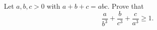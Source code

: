 Let $a,b,c>0$ with $a+b+c=abc$. Prove that
\[
\dfrac{a}{b^3}+\dfrac{b}{c^3}+\dfrac{c}{a^3}\ge1 .
\]
